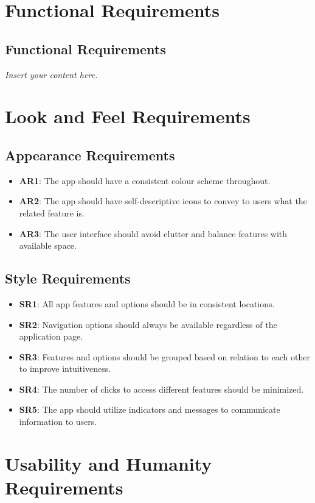 \documentclass[12pt]{article}
\newcommand{\lips}{\textit{Insert your content here.}}
\begin{document}
\section{Functional Requirements}
\subsection{Functional Requirements}
\lips

\section{Look and Feel Requirements}
\subsection{Appearance Requirements}
\begin{itemize}
  \item \textbf{AR1}: The app should have a consistent colour scheme throughout.
  \item \textbf{AR2}: The app should have self-descriptive icons to convey to users what the related feature is.
  \item \textbf{AR3}: The user interface should avoid clutter and balance features with available space.
\end{itemize}
\subsection{Style Requirements}
\begin{itemize}
  \item \textbf{SR1}: All app features and options should be in consistent locations.
  \item \textbf{SR2}: Navigation options should always be available regardless of the application page.
  \item \textbf{SR3}: Features and options should be grouped based on relation to each other to improve intuitiveness.
  \item \textbf{SR4}: The number of clicks to access different features should be minimized.
  \item \textbf{SR5}: The app should utilize indicators and messages to communicate information to users.
\end{itemize}

\section{Usability and Humanity Requirements}
\end{document}
